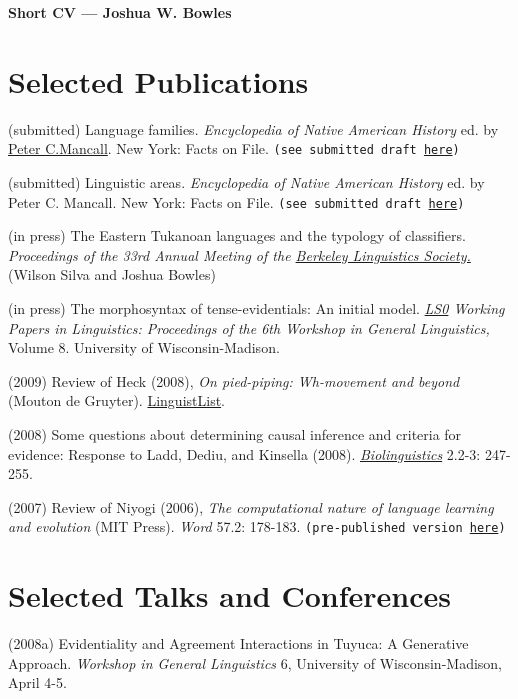 \documentclass[line]{resume}
\begin{document}
 
{\sc \Large {\bf Short CV --- Joshua W. Bowles}}
\begin{resume}


\section{Selected Publications}

(submitted) Language families. \emph{Encyclopedia of Native American History} ed. by \href{http://college.usc.edu/faculty/faculty1003494.html}{Peter C.Mancall}. New York: Facts on File. \texttt{(see submitted draft \href{http://sites.google.com/site/bowleslinguistics/Home/research/teaching-1/publications}{here})}

(submitted) Linguistic areas. \emph{Encyclopedia of Native American History} ed. by Peter C. Mancall. New York: Facts on File. \texttt{(see submitted draft \href{http://sites.google.com/site/bowleslinguistics/Home/research/teaching-1/publications}{here})}

(in press) The Eastern Tukanoan languages and the typology of classifiers. \emph{Proceedings of the 33rd
Annual Meeting of the \href{http://linguistics.berkeley.edu/BLS/past_meetings.html}{Berkeley Linguistics Society.}} (Wilson Silva and Joshua Bowles)

(in press) The morphosyntax of tense-evidentials: An initial model. \emph{\href{http://ling.wisc.edu/lso/wpl-main.html}{LS0} Working Papers in Linguistics: Proceedings of the 6th Workshop in General Linguistics,} Volume 8. University of Wisconsin-Madison.

(2009) Review of Heck (2008), \emph{On pied-piping: Wh-movement and beyond} (Mouton de
Gruyter). \href{http://linguistlist.org/issues/20/20-2283.html}{LinguistList}.

(2008) Some questions about determining causal inference and criteria for evidence:
Response to Ladd, Dediu, and Kinsella (2008). \emph{\href{http://www.biolinguistics.eu.}{Biolinguistics}} 2.2-3: 247-255.

(2007) Review of Niyogi (2006), \emph{The computational nature of language learning and evolution} (MIT Press). {\it Word} 57.2: 178-183. \texttt{(pre-published version \href{http://sites.google.com/site/bowleslinguistics/Home/research/teaching-1/publications}{here})}

\section{Selected Talks and Conferences}
(2008a) Evidentiality and Agreement Interactions in Tuyuca: A Generative Approach.
\emph{Workshop in General Linguistics} 6, University of Wisconsin-Madison, April 4-5.


\end{resume}
\end{document}
